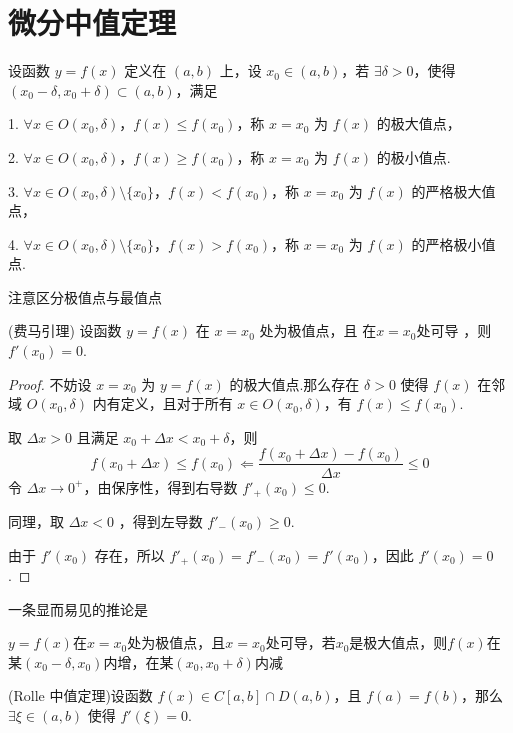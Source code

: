 \section{微分中值定理}
\begin{definition}
	设函数 \( y = f(x) \) 定义在 \((a, b)\) 上，设 \( x_0 \in (a, b) \)，若 \(\exists \delta > 0\)，使得 \((x_0 - \delta, x_0 + \delta) \subset (a, b)\)，满足
	
	1. \(\forall x \in O(x_0, \delta)\)，\(f(x) \leqslant f(x_0)\)，称 \(x = x_0\) 为 \(f(x)\) 的极大值点，
	
	2. \(\forall x \in O(x_0, \delta)\)，\(f(x) \geqslant f(x_0)\)，称 \(x = x_0\) 为 \(f(x)\) 的极小值点.
	
	3. \(\forall x \in O(x_0, \delta)\setminus\{x_0\}\)，\(f(x) <f(x_0)\)，称 \(x = x_0\) 为 \(f(x)\) 的严格极大值点，
	
	4. \(\forall x \in O(x_0, \delta)\setminus\{x_0\}\)，\(f(x) > f(x_0)\)，称 \(x = x_0\) 为 \(f(x)\) 的严格极小值点.
\end{definition}
注意区分极值点与最值点
\begin{lemma}(费马引理)
	设函数 \( y = f(x) \) 在 \( x = x_0 \) 处为极值点，且 在$x=x_0$处可导 ，则 \( f'(x_0) = 0 \).
\end{lemma}
\begin{proof}
	不妨设 \( x = x_0 \) 为 \( y = f(x) \) 的极大值点.那么存在 \(\delta > 0\) 使得 \( f(x) \) 在邻域 \( O(x_0, \delta) \) 内有定义，且对于所有 \( x \in O(x_0, \delta) \)，有 \( f(x) \leqslant f(x_0) \).
	
	取 \(\Delta x > 0\) 且满足 \( x_0 + \Delta x < x_0 + \delta \)，则
	\[f(x_0+\Delta x)\leqslant f(x_0)\Leftarrow
	\frac{f(x_0 + \Delta x) - f(x_0)}{\Delta x} \leqslant 0
	\]
	令 \(\Delta x \to 0^+\)，由保序性，得到右导数 \( f'_+(x_0) \leqslant 0 \).
	
	同理，取 \(\Delta x < 0\) ，得到左导数 \( f'_-(x_0) \geqslant 0 \).
	
	由于 \( f'(x_0) \) 存在，所以 \( f'_+(x_0) = f'_-(x_0) = f'(x_0) \)，因此 \( f'(x_0) = 0 \).
\end{proof}
一条显而易见的推论是
\begin{corollary}
	$y=f(x)$在$x=x_0$处为极值点，且$x=x_0$处可导，若$x_0$是极大值点，则$f(x)$在某$(x_0-\delta,x_0)$内增，在某$(x_0,x_0+\delta)$内减
\end{corollary}
\begin{theorem}
	(Rolle 中值定理)设函数 \( f(x) \in C[a, b] \cap D(a, b) \)，且 \( f(a) = f(b) \)，那么 \(\exists \xi \in (a, b)\) 使得 \( f'(\xi) = 0 \).
\end{theorem}
